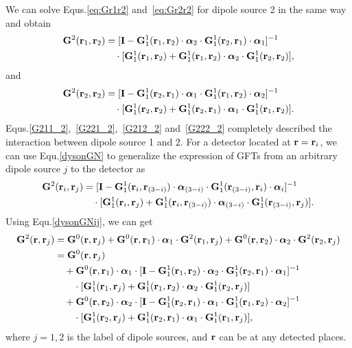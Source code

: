 We can solve Equs.\eqref{eq:Gr1r2} and~\eqref{eq:Gr2r2} for dipole source 2 in the same way and obtain
\begin{equation}
\label{G212_2}
\begin{split}
\mathbf{G}^2(\mathbf{r}_1,\mathbf{r}_2)&=[\mathbf{I}-\mathbf{G}^1_1(\mathbf{r}_1,\mathbf{r}_2)\cdot {\bm \alpha}_2\cdot \mathbf{G}^1_1(\mathbf{r}_2,\mathbf{r}_1)\cdot{\bm \alpha}_1]^{-1}\\
&\quad \cdot [\mathbf{G}^1_1(\mathbf{r}_1,\mathbf{r}_2)+ \mathbf{G}^1_1(\mathbf{r}_1,\mathbf{r}_2)\cdot {\bm \alpha}_2\cdot \mathbf{G}^1_1(\mathbf{r}_2,\mathbf{r}_2)],
\end{split}
\end{equation}
and
\begin{equation}
\label{G222_2}
\begin{split}
\mathbf{G}^2(\mathbf{r}_2,\mathbf{r}_2)&=[\mathbf{I}-\mathbf{G}^1_1(\mathbf{r}_2,\mathbf{r}_1)\cdot {\bm \alpha}_1\cdot \mathbf{G}^1_1(\mathbf{r}_1,\mathbf{r}_2)\cdot{\bm \alpha}_2]^{-1}\\
&\quad \cdot [\mathbf{G}^1_1(\mathbf{r}_2,\mathbf{r}_2)+ \mathbf{G}^1_1(\mathbf{r}_2,\mathbf{r}_1)\cdot {\bm \alpha}_1\cdot \mathbf{G}^1_1(\mathbf{r}_1,\mathbf{r}_2)].
\end{split}
\end{equation}
Equs.\eqref{G211_2},~\eqref{G221_2},~\eqref{G212_2} and~\eqref{G222_2} completely described the interaction between dipole source 1 and 2. For a detector located at $\mathbf{r}=\mathbf{r}_i$, we can use Equ.\eqref{dysonGN} to generalize the expression of GFTs from an arbitrary dipole source $j$ to the detector as
\begin{equation}
\label{G2ij_2}
\begin{aligned}
\mathbf{G}^2(\mathbf{r}_i,\mathbf{r}_j) &=[\mathbf{I}-\mathbf{G}^1_1(\mathbf{r}_i,\mathbf{r}_{(3-i)})\cdot {\bm \alpha}_{(3-i)}\cdot \mathbf{G}^1_1(\mathbf{r}_{(3-i)},\mathbf{r}_i)\cdot{\bm \alpha}_i]^{-1}\\
&\quad \cdot [\mathbf{G}^1_1(\mathbf{r}_i,\mathbf{r}_j)+ \mathbf{G}^1_1(\mathbf{r}_i,\mathbf{r}_{(3-i)})\cdot {\bm \alpha}_{(3-i)}\cdot \mathbf{G}^1_1(\mathbf{r}_{(3-i)},\mathbf{r}_j)].
\end{aligned}
\end{equation}
Using Equ.\eqref{dysonGNij}, we can get
\begin{equation}
 \label{G2rrj_2}
\begin{aligned}
\mathbf{G}^2(\mathbf{r},\mathbf{r}_j) &=\mathbf{G}^{0}(\mathbf{r},\mathbf{r}_j)+\mathbf{G}^{0}(\mathbf{r},\mathbf{r}_1)\cdot {\bm \alpha}_1 \cdot \mathbf{G}^2(\mathbf{r}_1,\mathbf{r}_j)+\mathbf{G}^0(\mathbf{r},\mathbf{r}_2)\cdot {\bm \alpha}_2\cdot \mathbf{G}^2(\mathbf{r}_2,\mathbf{r}_j)\\
&=\mathbf{G}^{0}(\mathbf{r},\mathbf{r}_j)\\
&\quad + \mathbf{G}^{0}(\mathbf{r},\mathbf{r}_1)\cdot {\bm \alpha}_1 \cdot [\mathbf{I}-\mathbf{G}^1_1(\mathbf{r}_1,\mathbf{r}_{2})\cdot {\bm \alpha}_{2}\cdot \mathbf{G}^1_1(\mathbf{r}_{2},\mathbf{r}_1)\cdot{\bm \alpha}_1]^{-1}\\
&\quad \quad \cdot [\mathbf{G}^1_1(\mathbf{r}_1,\mathbf{r}_j)+ \mathbf{G}^1_1(\mathbf{r}_1,\mathbf{r}_{2})\cdot {\bm \alpha}_{2}\cdot \mathbf{G}^1_1(\mathbf{r}_{2},\mathbf{r}_j)]\\
&\quad +\mathbf{G}^0(\mathbf{r},\mathbf{r}_2)\cdot {\bm \alpha}_2\cdot [\mathbf{I}-\mathbf{G}^1_1(\mathbf{r}_2,\mathbf{r}_{1})\cdot {\bm \alpha}_{1}\cdot \mathbf{G}^1_1(\mathbf{r}_{1},\mathbf{r}_2)\cdot{\bm \alpha}_2]^{-1}\\
&\quad \quad \cdot [\mathbf{G}^1_1(\mathbf{r}_2,\mathbf{r}_j)+ \mathbf{G}^1_1(\mathbf{r}_2,\mathbf{r}_{1})\cdot {\bm \alpha}_{1}\cdot \mathbf{G}^1_1(\mathbf{r}_{1},\mathbf{r}_j)],
\end{aligned}
\end{equation}
where $j=1,2$ is the label of dipole sources, and $\mathbf{r}$ can be at any detected places.


